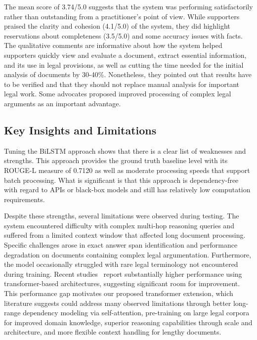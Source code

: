 \documentclass{llncs}
\begin{document}
The mean score of 3.74/5.0 suggests that the system was performing satisfactorily rather than outstanding from a practitioner’s point of view. While supporters praised the clarity and cohesion (4.1/5.0) of the system, they did highlight reservations about completeness (3.5/5.0) and some accuracy issues with facts. The qualitative comments are informative about how the system helped supporters quickly view and evaluate a document, extract essential information, and its use in legal provisions, as well as cutting the time needed for the initial analysis of documents by 30-40\%. Nonetheless, they pointed out that results have to be verified and that they should not replace manual analysis for important legal work. Some advocates proposed improved processing of complex legal arguments as an important advantage.

\subsection{Key Insights and Limitations}

Tuning the BiLSTM approach shows that there is a clear list of weaknesses and strengths. This approach provides the ground truth baseline level with its ROUGE-L measure of 0.7120 as well as moderate processing speeds that support batch processing. What is significant is that this approach is dependency-free with regard to APIs or black-box models and still has relatively low computation requirements.

Despite these strengths, several limitations were observed during testing. The system encountered difficulty with complex multi-hop reasoning queries and suffered from a limited context window that affected long document processing. Specific challenges arose in exact answer span identification and performance degradation on documents containing complex legal argumentation. Furthermore, the model occasionally struggled with rare legal terminology not encountered during training. Recent studies~\cite{nigam2023legal,oliveira2025similarity} report substantially higher performance using transformer-based architectures, suggesting significant room for improvement. This performance gap motivates our proposed transformer extension, which literature suggests could address many observed limitations through better long-range dependency modeling via self-attention, pre-training on large legal corpora for improved domain knowledge, superior reasoning capabilities through scale and architecture, and more flexible context handling for lengthy documents.
\end{document}

